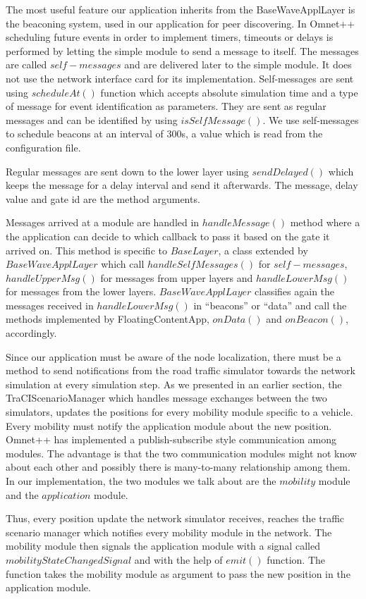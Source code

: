 The most useful feature our application inherits from the BaseWaveApplLayer is
the beaconing system, used in our application for peer discovering. In Omnet++
scheduling future events in order to implement timers, timeouts or delays is
performed by letting the simple module to send a message to itself. The messages
are called $self-messages$ and are delivered later to the simple module. It does
not use the network interface card for its implementation. Self-messages are
sent using $scheduleAt()$ function which accepts absolute simulation time and a
type of message for event identification as parameters. They are sent as regular
messages and can be identified by using $isSelfMessage()$. We use self-messages
to schedule beacons at an interval of 300s, a value which is read from the
configuration file.

Regular messages are sent down to the lower layer using $sendDelayed()$ which
keeps the message for a delay interval and send it afterwards. The message,
delay value and gate id are the method arguments.

Messages arrived at a module are handled in $handleMessage()$ method where a the
application can decide to which callback to pass it based on the gate it arrived
on. This method is specific to $BaseLayer$, a class extended by
$BaseWaveApplLayer$ which call $handleSelfMessages()$ for $self-messages$,
$handleUpperMsg()$ for messages from upper layers and $handleLowerMsg()$ for
messages from the lower layers. $BaseWaveApplLayer$ classifies again the
messages received in $handleLowerMsg()$ in ``beacons'' or ``data'' and call the
methods implemented by FloatingContentApp, $onData()$ and $onBeacon()$, accordingly.

Since our application must be aware of the node localization, there must be a
method to send notifications from the road traffic simulator towards the network
simulation at every simulation step. As we presented in an earlier section, the
TraCIScenarioManager which handles message exchanges between the two simulators,
updates the positions for every mobility module specific to a vehicle. Every
mobility must notify the application module about the new position. Omnet++ has
implemented a publish-subscribe style communication among modules. The advantage
is that the two communication modules might not know about each other and
possibly there is many-to-many relationship among them. In our implementation,
the two modules we talk about are the $mobility$ module and the $application$
module.

Thus, every position update the network simulator receives, reaches the
traffic scenario manager which notifies every mobility module in the network.
The mobility module then signals the application module with a signal called
$mobilityStateChangedSignal$ and with the help of $emit()$ function. The function
takes the mobility module as argument to pass the new position in the
application module.

